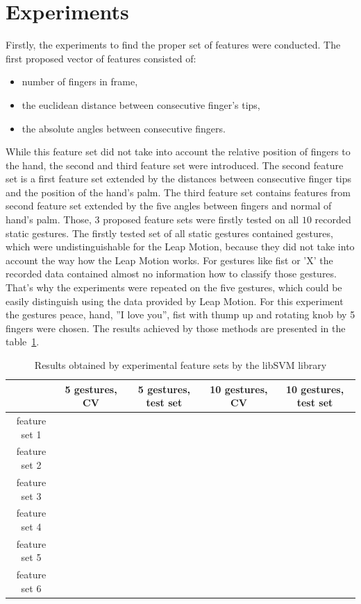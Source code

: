 \section{Experiments}
\label{static:exp}

Firstly, the experiments to find the proper set of features were conducted. The first proposed vector of features consisted of:
\begin{itemize}
\item number of fingers in frame,
\item the euclidean distance between consecutive finger's tips,
\item the absolute angles between consecutive fingers.
\end{itemize} 

While this feature set did not take into account the relative position of fingers to the hand, the second and third feature set were introduced.
The second feature set is a first feature set extended by the distances between consecutive finger tips and the position of the hand's palm.
The third feature set contains features from second feature set extended by the five angles between fingers and normal of hand's palm.
Those, 3 proposed feature sets were firstly tested on all $10$ recorded static gestures.
The firstly tested set of all static gestures contained gestures, which were undistinguishable for the Leap Motion, because they did not take into account the way how the Leap Motion works. 
For gestures like fist or 'X' the recorded data contained almost no information how to classify those gestures.
That's why the experiments were repeated on the five gestures, which could be easily distinguish using the data provided by Leap Motion. 
For this experiment the gestures peace, hand, ''I love you'', fist with thump up and rotating knob by 5 fingers were chosen.
The results achieved by those methods are presented in the table~\ref{staticfeat}.

\begin{table}[htp!]
	\label{staticfeat}
	\caption{Results obtained by experimental feature sets by the libSVM library}
    \begin{tabular}{|c|c|c|c|c|}
    \hline
    ~                                                   & 5 gestures, CV & 5 gestures, test set & 10 gestures, CV  & 10 gestures, test set \\ \hline
    feature set 1                     & ~      & ~           & ~       & ~           \\ \hline
    feature set 2                     & ~      & ~           & ~       & ~          \\ \hline
    feature set 3                     & ~      & ~           & ~       & ~           \\ \hline
    feature set 4                     & ~      & ~           & ~       & ~           \\ \hline
    feature set 5                     & ~      & ~           & ~       & ~          \\ \hline
    feature set 6                     & ~      & ~           & ~       & ~           \\ \hline
    \end{tabular}
\end{table}

